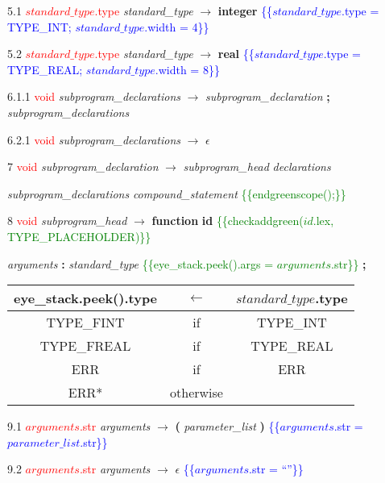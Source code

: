 5.1  \textcolor{red}{$standard\_type$.type} \emph{standard\_type} $\rightarrow$ \textbf{integer} \textcolor{blue}{\{\{$standard\_type$.type = TYPE_INT; $standard\_type$.width = 4\}\}}

5.2  \textcolor{red}{$standard\_type$.type} \emph{standard\_type} $\rightarrow$ \textbf{real} \textcolor{blue}{\{\{$standard\_type$.type = TYPE_REAL; $standard\_type$.width = 8\}\}}

6.1.1  \textcolor{red}{void} \emph{subprogram\_declarations} $\rightarrow$ \emph{subprogram\_declaration} \textbf{;} \emph{subprogram\_declarations}

6.2.1  \textcolor{red}{void} \emph{subprogram\_declarations} $\rightarrow$ $\epsilon$

7    \textcolor{red}{void} \emph{subprogram\_declaration} $\rightarrow$ \emph{subprogram\_head} \emph{declarations}

\emph{subprogram\_declarations} \emph{compound\_statement} \textcolor{green}{\{\{endgreenscope();\}\}}

8  \textcolor{red}{void}  \emph{subprogram\_head} $\rightarrow$ \textbf{function} \textbf{id} \textcolor{green}{\{\{checkaddgreen($id$.lex, TYPE_PLACEHOLDER)\}\}}

\emph{arguments} \textbf{:} \emph{standard\_type} \textcolor{green}{\{\{eye\_stack.peek().args = $arguments$.str\}\}} \textbf{;}

\begin{tabular}[t]{|ccc|}
  \hline

  eye\_stack.peek().type & \textbf{$\leftarrow$} & $standard\_type$.type \\

  \hline

  TYPE_FINT & if & TYPE_INT \\

  TYPE_FREAL & if & TYPE_REAL \\

  ERR  & if & ERR \\

  ERR* & otherwise & \\

  \hline
\end{tabular}


9.1  \textcolor{red}{$arguments$.str} \emph{arguments} $\rightarrow$ \textbf{(} \emph{parameter\_list} \textbf{)} \textcolor{blue}{\{\{$arguments$.str = $parameter\_list$.str\}\}}

9.2  \textcolor{red}{$arguments$.str} \emph{arguments} $\rightarrow$ $\epsilon$ \textcolor{blue}{\{\{$arguments$.str = ``''\}\}}

